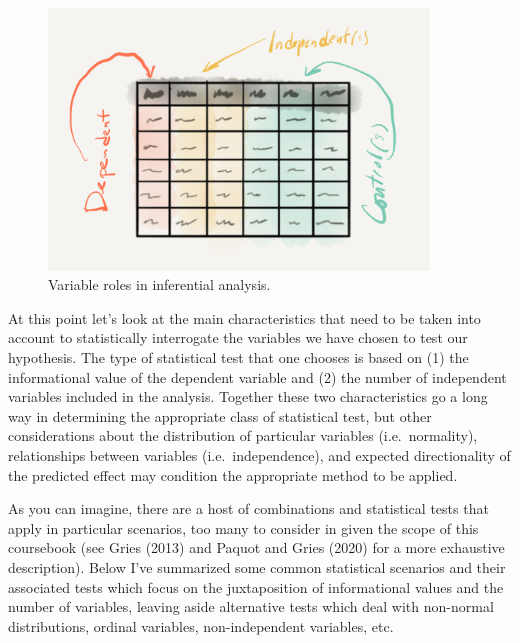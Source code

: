 \documentclass[
  letterpaper,
]{latex/krantz}
\begin{document}
\begin{figure}

{\centering \includegraphics[width=0.9\textwidth,height=\textheight]{./figures/approaching-analysis/inferential-variables.png}

}

\caption{\label{fig-aa-inferential-variables}Variable roles in
inferential analysis.}

\end{figure}

At this point let's look at the main characteristics that need to be
taken into account to statistically interrogate the variables we have
chosen to test our hypothesis. The type of statistical test that one
chooses is based on (1) the informational value of the dependent
variable and (2) the number of independent variables included in the
analysis. Together these two characteristics go a long way in
determining the appropriate class of statistical test, but other
considerations about the distribution of particular variables
(i.e.~normality), relationships between variables (i.e.~independence),
and expected directionality of the predicted effect may condition the
appropriate method to be applied.

As you can imagine, there are a host of combinations and statistical
tests that apply in particular scenarios, too many to consider in given
the scope of this coursebook (see Gries (2013) and Paquot and Gries
(2020) for a more exhaustive description). Below I've summarized some
common statistical scenarios and their associated tests which focus on
the juxtaposition of informational values and the number of variables,
leaving aside alternative tests which deal with non-normal
distributions, ordinal variables, non-independent variables, etc.
\end{document}
